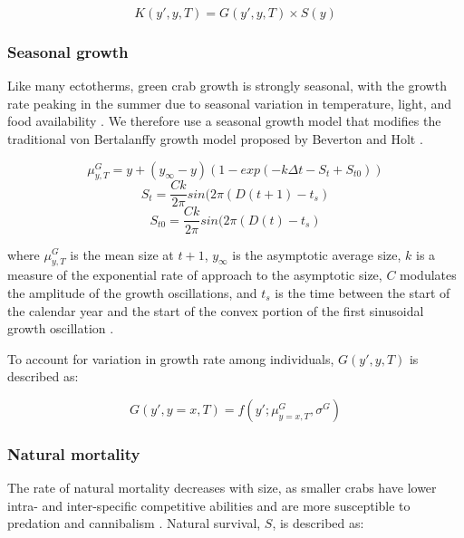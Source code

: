 \documentclass{article}
\begin{document}
\begin{equation}
K(y',y, T) = G(y',y, T) \times S(y)
\end{equation}

\subsubsection*{Seasonal growth}

Like many ectotherms, green crab growth is strongly seasonal, with the growth rate peaking in the summer due to seasonal variation in temperature, light, and food availability \parencite{contreras2003population, garcia2012technical}. We therefore use a seasonal growth model that modifies the traditional von Bertalanffy growth model proposed by Beverton and Holt \parencite{beverton2012dynamics, somers1988seasonally}.

\begin{equation}
\mu^G_{y,T} = y + (y_{\infty}-y)(1-exp(-k\Delta t-S_t+S_{t0}))
\end{equation}
\begin{equation}
S_t = \frac{Ck}{2\pi} sin(2\pi(D(t+1)-t_s)
\end{equation}
\begin{equation}
S_{t0} = \frac{Ck}{2\pi} sin(2\pi(D(t)-t_s)
\end{equation}

where $\mu^G_{y,T}$ is the mean size at $t+1$, $y_{\infty}$ is the asymptotic average size, $k$ is a measure of the exponential rate of approach to the asymptotic size, $C$ modulates the amplitude of the growth oscillations, and $t_s$ is the time between the start of the calendar year and the start of the convex portion of the first sinusoidal growth oscillation \parencite{garcia2012technical}.

To account for variation in growth rate among individuals, $G(y',y, T)$ is described as:

\begin{equation}
G(y',y=x, T) = f(y'; \mu^G_{y=x, T}, \sigma^G)
\end{equation}

\subsubsection*{Natural mortality}

The rate of natural mortality decreases with size, as smaller crabs have lower intra- and inter-specific competitive abilities and are more susceptible to predation and cannibalism \parencite{maszczyk2018body, grosholz2021stage}. Natural survival, $S$, is described as: 
\end{document}
